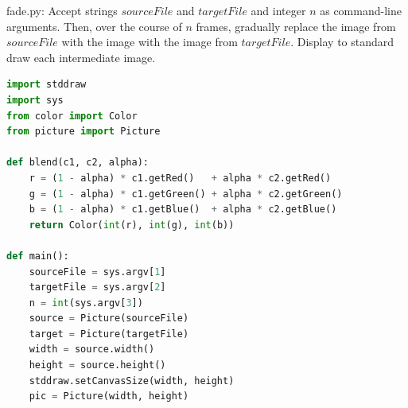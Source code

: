 \documentclass[8pt,a4paper,compress,handout]{beamer}
\begin{document}
\begin{frame}[fragile]
\begin{framed}
\tiny fade.py: Accept strings $sourceFile$ and $targetFile$ and integer $n$ as command-line arguments. Then, over the course of $n$ frames, gradually replace the image from $sourceFile$ with the image with the image from $targetFile$. Display to standard draw each intermediate image. 
\end{framed}

\begin{lstlisting}[language=Python]
import stddraw
import sys
from color import Color
from picture import Picture

def blend(c1, c2, alpha):
    r = (1 - alpha) * c1.getRed()   + alpha * c2.getRed()
    g = (1 - alpha) * c1.getGreen() + alpha * c2.getGreen()
    b = (1 - alpha) * c1.getBlue()  + alpha * c2.getBlue()
    return Color(int(r), int(g), int(b))

def main():
    sourceFile = sys.argv[1]
    targetFile = sys.argv[2]
    n = int(sys.argv[3])
    source = Picture(sourceFile)
    target = Picture(targetFile)
    width = source.width()
    height = source.height()
    stddraw.setCanvasSize(width, height)
    pic = Picture(width, height)
\end{lstlisting}
\end{frame}
\end{document}
